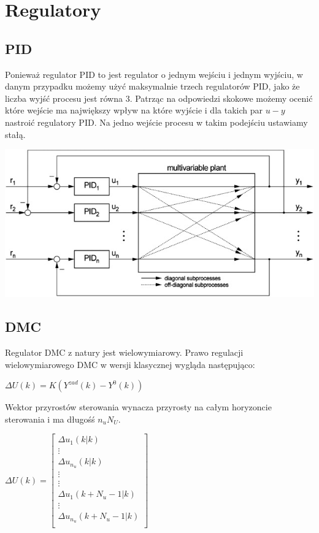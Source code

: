 \chapter{Regulatory}

\section{PID}

Ponieważ regulator PID to jest regulator o jednym wejściu i jednym wyjściu, w danym przypadku możemy użyć maksymalnie trzech regulatorów PID, jako że liczba wyjść procesu jest równa 3. Patrząc na odpowiedzi skokowe możemy ocenić które wejście ma największy wpływ na które wyjście i dla takich par $u - y$ nastroić regulatory PID. Na jedno wejście procesu w takim podejściu ustawiamy stałą.

\medskip

\includegraphics{../images/MPID.jpg}

\section{DMC}

Regulator DMC z natury jest wielowymiarowy. Prawo regulacji wielowymiarowego DMC w wersji klasycznej wygląda następująco:

\begin{math}
    \Delta U(k) = K(Y^{zad}(k) - Y^0(k))
\end{math}

Wektor przyrostów sterowania wynacza przyrosty na całym horyzoncie sterowania i ma długośś $n_uN_U$.

\begin{math}
    \Delta U(k) = \begin{bmatrix}
        \Delta u_1(k|k) \\
        \vdots  \\
        \Delta u_{n_u}(k|k) \\
        \vdots  \\
        \vdots  \\
        \Delta u_{1}(k + N_u - 1|k) \\
        \vdots  \\
        \Delta u_{n_u}(k + N_u - 1|k) \\
    \end{bmatrix}
\end{math}


